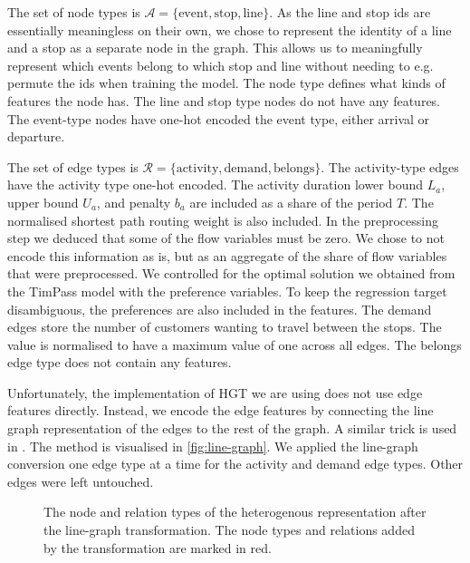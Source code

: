 \documentclass[english, 12pt, a4paper, sci, utf8, a-2b, online]{aaltothesis}
\begin{document}
The set of node types is $\mathcal{A} = \{\text{event}, \text{stop}, \text{line}\}$. As the line and stop ids are essentially meaningless on their own, we chose to represent the identity of a line and a stop as a separate node in the graph. This allows us to meaningfully represent which events belong to which stop and line without needing to e.g. permute the ids when training the model. The node type defines what kinds of features the node has. The line and stop type nodes do not have any features. The event-type nodes have one-hot encoded the event type, either arrival or departure.

The set of edge types is $\mathcal{R} = \{\text{activity}, \text{demand}, \text{belongs}\}$. The activity-type edges have the activity type one-hot encoded. The activity duration lower bound $L_a$, upper bound $U_a$, and penalty $b_a$ are included as a share of the period $T$. The normalised shortest path routing weight is also included. In the preprocessing step we deduced that some of the flow variables must be zero. We chose to not encode this information as is, but as an aggregate of the share of flow variables that were preprocessed. We controlled for the optimal solution we obtained from the TimPass model with the preference variables.
To keep the regression target disambiguous, the preferences are also included in the features.
The demand edges store the number of customers wanting to travel between the stops. The value is normalised to have a maximum value of one across all edges. The belongs edge type does not contain any features.

Unfortunately, the implementation of HGT we are using does not use edge features directly. Instead, we encode the edge features by connecting the line graph representation of the edges to the rest of the graph. A similar trick is used in \cite{line-graph-trick}. The method is visualised in \cref{fig:line-graph}. We applied the line-graph conversion one edge type at a time for the activity and demand edge types. Other edges were left untouched.


\begin{figure}[t]
    \centering
    
    \caption{The node and relation types of the heterogenous representation after the line-graph transformation. The node types and relations added by the transformation are marked in red.}
    \label{fig:hetero-relations}
\end{figure}
\end{document}
